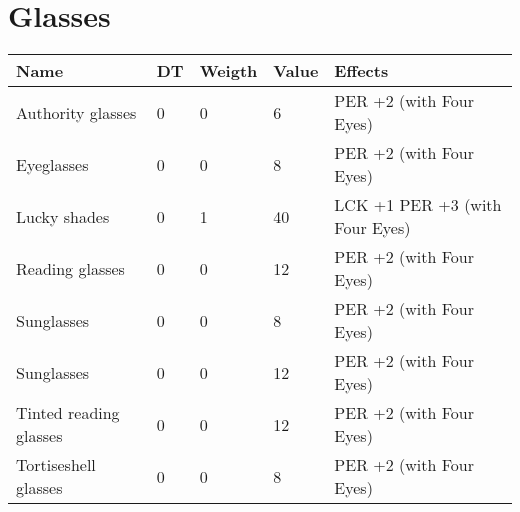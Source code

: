 \documentclass{report}
\begin{document}
\begin{table}[H]
\begin{table}[H]
\begin{table}[H]
\begin{table}[H]
\begin{table}[H]
\begin{table}[H]
\begin{table}[H]
\begin{table}[H]
\begin{table}[H]
\begin{table}[H]
\begin{table}[H]
\begin{table}[H]
\begin{table}[H]
\begin{table}[H]
\begin{table}[H]
\begin{table}[H]
\begin{table}[H]
\begin{table}[H]
\begin{table}[H]
\begin{table}[H]
\chapter{Glasses}
\begin{table}[H]
  \centering
  \begin{tabular}{p{30mm}p{30mm}p{30mm}p{30mm}p{30mm}}
\bfseries Name & \bfseries DT & \bfseries Weigth & \bfseries Value & \bfseries Effects \\
\hline
Authority glasses  & 0 & 0 & 6 & PER +2 (with Four Eyes)  \\
Eyeglasses  & 0 & 0 & 8 & PER +2 (with Four Eyes)  \\
Lucky shades  & 0 & 1 & 40 & LCK +1 PER +3 (with Four Eyes)  \\
Reading glasses  & 0 & 0 & 12 & PER +2 (with Four Eyes)  \\
Sunglasses  & 0 & 0 & 8 & PER +2 (with Four Eyes)  \\
Sunglasses  & 0 & 0 & 12 & PER +2 (with Four Eyes)  \\
Tinted reading glasses  & 0 & 0 & 12 & PER +2 (with Four Eyes)  \\
Tortiseshell glasses  & 0 & 0 & 8 & PER +2 (with Four Eyes)  \\
  \end{tabular}

\end{table}
\end{table}
\end{table}
\end{table}
\end{table}
\end{table}
\end{table}
\end{table}
\end{table}
\end{table}
\end{table}
\end{table}
\end{table}
\end{table}
\end{table}
\end{table}
\end{table}
\end{table}
\end{table}
\end{table}
\end{table}
\end{document}
